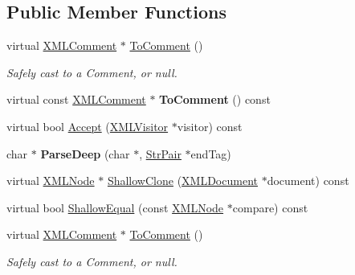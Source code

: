 \subsection*{Public Member Functions}
\begin{DoxyCompactItemize}
\item 
\mbox{\label{classtinyxml2_1_1XMLComment_a8093e1dc8a34fa446d9dc3fde0e6c0ee}} 
virtual \hyperlink{classtinyxml2_1_1XMLComment}{X\+M\+L\+Comment} $\ast$ \hyperlink{classtinyxml2_1_1XMLComment_a8093e1dc8a34fa446d9dc3fde0e6c0ee}{To\+Comment} ()
\begin{DoxyCompactList}\small\item\em Safely cast to a Comment, or null. \end{DoxyCompactList}\item 
\mbox{\label{classtinyxml2_1_1XMLComment_a8e60caf06d8e88876a94b81db026b85c}} 
virtual const \hyperlink{classtinyxml2_1_1XMLComment}{X\+M\+L\+Comment} $\ast$ {\bfseries To\+Comment} () const
\item 
virtual bool \hyperlink{classtinyxml2_1_1XMLComment_a27b37d16cea01b5329dfbbb4f9508e39}{Accept} (\hyperlink{classtinyxml2_1_1XMLVisitor}{X\+M\+L\+Visitor} $\ast$visitor) const
\item 
\mbox{\label{classtinyxml2_1_1XMLComment_aa6ab35c3bb1c1840371dc32a2040c57f}} 
char $\ast$ {\bfseries Parse\+Deep} (char $\ast$, \hyperlink{classtinyxml2_1_1StrPair}{Str\+Pair} $\ast$end\+Tag)
\item 
virtual \hyperlink{classtinyxml2_1_1XMLNode}{X\+M\+L\+Node} $\ast$ \hyperlink{classtinyxml2_1_1XMLComment_adf5b5c0319351dcc339df098d11e8fb2}{Shallow\+Clone} (\hyperlink{classtinyxml2_1_1XMLDocument}{X\+M\+L\+Document} $\ast$document) const
\item 
virtual bool \hyperlink{classtinyxml2_1_1XMLComment_a965d880a99d58dd915caa88dc37a9b51}{Shallow\+Equal} (const \hyperlink{classtinyxml2_1_1XMLNode}{X\+M\+L\+Node} $\ast$compare) const
\item 
\mbox{\label{classtinyxml2_1_1XMLComment_a8093e1dc8a34fa446d9dc3fde0e6c0ee}} 
virtual \hyperlink{classtinyxml2_1_1XMLComment}{X\+M\+L\+Comment} $\ast$ \hyperlink{classtinyxml2_1_1XMLComment_a8093e1dc8a34fa446d9dc3fde0e6c0ee}{To\+Comment} ()
\begin{DoxyCompactList}\small\item\em Safely cast to a Comment, or null. \end{DoxyCompactList}\item 

\end{DoxyCompactItemize}
